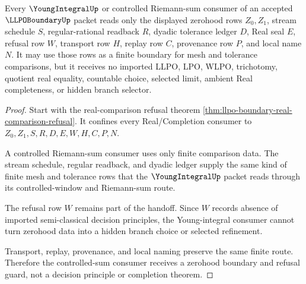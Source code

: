\begin{theorem}
\label{thm:llpo-boundary-young-integral-nonescape}
Every $\YoungIntegralUp$ or controlled Riemann-sum consumer of an accepted $\LLPOBoundaryUp$ packet reads only the displayed zerohood rows $Z_0,Z_1$, stream schedule $S$, regular-rational readback $R$, dyadic tolerance ledger $D$, Real seal $E$, refusal row $W$, transport row $H$, replay row $C$, provenance row $P$, and local name $N$. It may use those rows as a finite boundary for mesh and tolerance comparisons, but it receives no imported LLPO, LPO, WLPO, trichotomy, quotient real equality, countable choice, selected limit, ambient Real completeness, or hidden branch selector.
\end{theorem}
\begin{proof}
Start with the real-comparison refusal theorem \autoref{thm:llpo-boundary-real-comparison-refusal}. It confines every Real/Completion consumer to $Z_0,Z_1,S,R,D,E,W,H,C,P,N$.

A controlled Riemann-sum consumer uses only finite comparison data. The stream schedule, regular readback, and dyadic ledger supply the same kind of finite mesh and tolerance rows that the $\YoungIntegralUp$ packet reads through its controlled-window and Riemann-sum route.

The refusal row $W$ remains part of the handoff. Since $W$ records absence of imported semi-classical decision principles, the Young-integral consumer cannot turn zerohood data into a hidden branch choice or selected refinement.

Transport, replay, provenance, and local naming preserve the same finite route. Therefore the controlled-sum consumer receives a zerohood boundary and refusal guard, not a decision principle or completion theorem.
\end{proof}


\begin{closurestatus}{\LLPOBoundaryUp}
  \theoryclosure{\seedClosure}
  \formalstatus{\unformalizedV}
\end{closurestatus}
